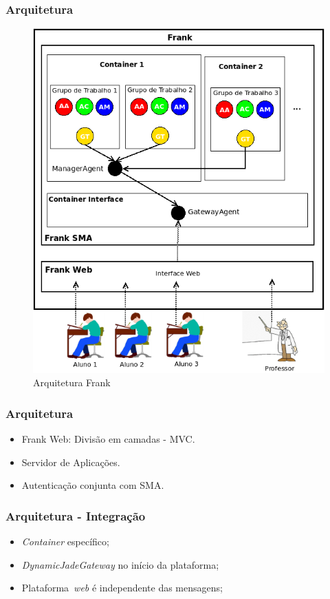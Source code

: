 \documentclass{beamer}
\begin{document}
\begin{frame}
    \frametitle{Arquitetura}
    \begin{figure}[h]
    	\centering \includegraphics[scale=0.3]{../images/arquitetura-frank.png}
	\caption{Arquitetura Frank}
	\label{arquiteturaFrank} 
    \end{figure}
\end{frame}

\begin{frame}
    \frametitle{Arquitetura}
    \begin{itemize}
        \item Frank Web: Divisão em camadas - MVC.
	\item Servidor de Aplicações.
        \item Autenticação conjunta com SMA.
    \end{itemize}
\end{frame}

\begin{frame}
    \frametitle{Arquitetura - Integração}
    \begin{itemize}
        \item \emph{Container} específico;
	\item \emph{DynamicJadeGateway} no início da plataforma;
	\item Plataforma~\emph{web} é independente das mensagens;
    \end{itemize}
\end{frame}
\end{document}
